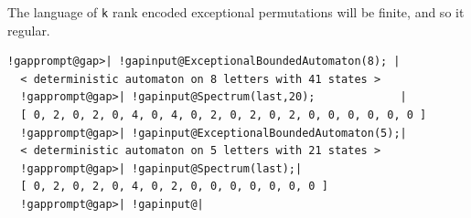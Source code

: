 \documentclass[a4paper,11pt]{report}
\begin{document}
{{{ The language of \texttt{k} rank encoded exceptional permutations will be finite, and so it regular. 
\begin{Verbatim}[commandchars=!@|,fontsize=\small,frame=single,label=Example]
  !gapprompt@gap>| !gapinput@ExceptionalBoundedAutomaton(8); |
  < deterministic automaton on 8 letters with 41 states >
  !gapprompt@gap>| !gapinput@Spectrum(last,20);             |
  [ 0, 2, 0, 2, 0, 4, 0, 4, 0, 2, 0, 2, 0, 2, 0, 0, 0, 0, 0, 0 ]
  !gapprompt@gap>| !gapinput@ExceptionalBoundedAutomaton(5);|
  < deterministic automaton on 5 letters with 21 states >
  !gapprompt@gap>| !gapinput@Spectrum(last);|
  [ 0, 2, 0, 2, 0, 4, 0, 2, 0, 0, 0, 0, 0, 0, 0 ]
  !gapprompt@gap>| !gapinput@|
\end{Verbatim}
 }

 }

 }

 
\end{document}
